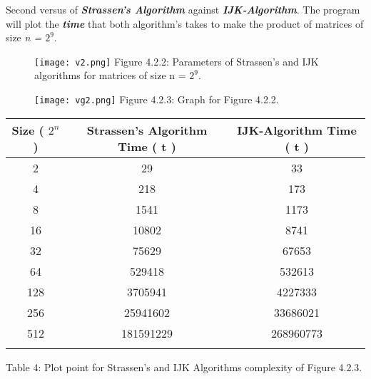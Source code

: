 \pagebreak

Second versus of {\bfseries\itshape Strassen's Algorithm} against {\bfseries\itshape IJK-Algorithm}. The program will plot the {\bfseries\itshape time} that both algorithm's takes to make the product of matrices of size {\itshape  n = $2^{9}$}. \hfill \break

\begin{figure}[H]
\texttt{[image: v2.png]}
\centering \linebreak \linebreak Figure 4.2.2: Parameters of Strassen's and IJK algorithms for matrices of size n = $2^{9}$.
\end{figure} 

\begin{figure}[H]
\texttt{[image: vg2.png]}
\centering \linebreak \linebreak Figure 4.2.3: Graph for Figure 4.2.2.
\end{figure} \hfill

\begin{center}
\begin{tabular}[.5cm]{ c c c }
\toprule
Size ( $2^{n}$ ) & Strassen's Algorithm Time ( t ) & IJK-Algorithm Time ( t ) \\
\midrule
2 & 29 & 33 \\
\cmidrule {1-3}
4 & 218 & 173 \\
\cmidrule {1-3}
8 & 1541 & 1173 \\
\cmidrule {1-3}
16 & 10802 & 8741 \\
\cmidrule {1-3}
32 & 75629 & 67653 \\
\cmidrule {1-3}
64 & 529418 & 532613 \\
\cmidrule {1-3}
128 & 3705941 & 4227333 \\
\cmidrule {1-3}
 256 & 25941602 & 33686021 \\
 \cmidrule {1-3}
 512 & 181591229 & 268960773 \\
\bottomrule
\linebreak
\end{tabular}
\linebreak \linebreak Table 4: Plot point for Strassen's and IJK Algorithms complexity of Figure 4.2.3.
\end{center} \hfill

{\bfseries\itshape\color{carmine}{Observation:}} {\itshape{}} \hfill \break

\pagebreak